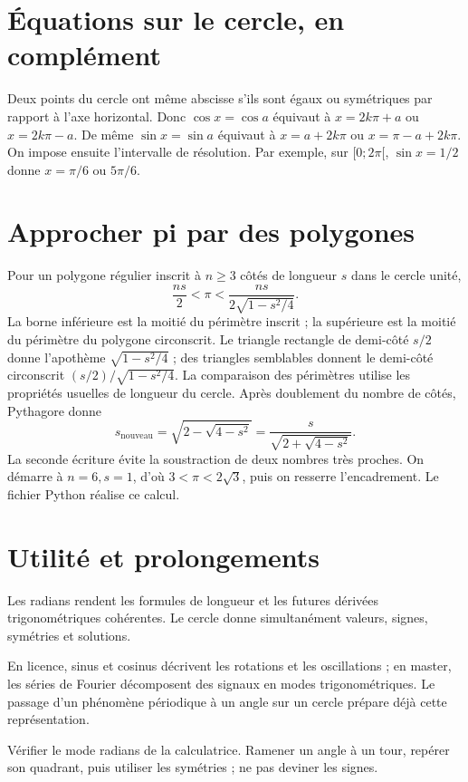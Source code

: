\documentclass[../cours_1re.tex]{subfiles}
\begin{document}
\section{Équations sur le cercle, en complément}
Deux points du cercle ont même abscisse s'ils sont égaux ou symétriques par rapport à l'axe horizontal. Donc
$\cos x=\cos a$ équivaut à $x=2k\pi+a$ ou $x=2k\pi-a$.
De même $\sin x=\sin a$ équivaut à $x=a+2k\pi$ ou $x=\pi-a+2k\pi$.
On impose ensuite l'intervalle de résolution. Par exemple, sur $[0;2\pi[$,
$\sin x=1/2$ donne $x=\pi/6$ ou $5\pi/6$.
\begin{finchapitre}
\section{Approcher pi par des polygones}
\approfondissement Pour un polygone régulier inscrit à $n\ge3$ côtés de longueur $s$ dans le cercle unité,
\[
\frac{ns}{2}<\pi<\frac{ns}{2\sqrt{1-s^2/4}}.
\]
La borne inférieure est la moitié du périmètre inscrit ; la supérieure est la moitié du périmètre du polygone circonscrit. Le triangle rectangle de demi-côté $s/2$ donne l'apothème $\sqrt{1-s^2/4}$ ; des triangles semblables donnent le demi-côté circonscrit $(s/2)/\sqrt{1-s^2/4}$.
La comparaison des périmètres utilise les propriétés usuelles de longueur du cercle.
Après doublement du nombre de côtés, Pythagore donne
\[
s_{\mathrm{nouveau}}=\sqrt{2-\sqrt{4-s^2}}
=\frac{s}{\sqrt{2+\sqrt{4-s^2}}}.
\]
La seconde écriture évite la soustraction de deux nombres très proches. On démarre à $n=6,s=1$, d'où $3<\pi<2\sqrt3$, puis on resserre l'encadrement. Le fichier Python réalise ce calcul.


\section{Utilité et prolongements}
Les radians rendent les formules de longueur et les futures dérivées trigonométriques cohérentes. Le cercle donne simultanément valeurs, signes, symétries et solutions.

En licence, sinus et cosinus décrivent les rotations et les oscillations ; en master, les séries de Fourier décomposent des signaux en modes trigonométriques. Le passage d'un phénomène périodique à un angle sur un cercle prépare déjà cette représentation.
\begin{retenir}
Vérifier le mode radians de la calculatrice. Ramener un angle à un tour, repérer son quadrant, puis utiliser les symétries ; ne pas deviner les signes.
\end{retenir}
\end{finchapitre}
\end{document}
